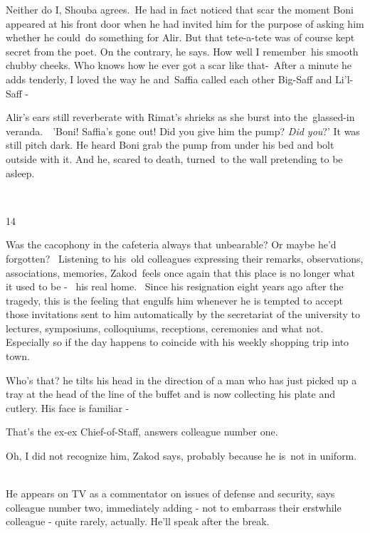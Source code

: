 \documentclass[twoside,11pt]{book}
\begin{document}
{\textquotedbl}Neither do I,{\textquotedbl} Shouba agrees.\  He had in fact noticed that scar the moment Boni appeared
at his front door when he had invited him for the purpose of asking him whether he could\ do something for Alir. But
that tete-a-tete was of course kept secret from the poet. {\textquotedbl}On the contrary,{\textquotedbl} he says.
{\textquotedbl}How well I remember~his smooth chubby cheeks. Who knows how he ever got a scar like
that{}-{\textquotedbl}\ After a minute he adds tenderly, {\textquotedbl}I loved the way he and~Saffia called each other
Big-Saff and Li'l-Saff -{\textquotedbl}

Alir's ears still reverberate with Rimat's shrieks as she burst into the\ glassed-in veranda.\ \ {}'Boni! Saffia's gone
out! Did you give him the pump? \textit{Did you}?' It was still pitch dark. He heard Boni grab the pump from under his
bed and bolt outside with it. And he, scared to death, turned~to the wall pretending to be asleep.

~

14 

Was the cacophony in the cafeteria always that unbearable? Or maybe he'd forgotten? ~Listening to his~old colleagues
expressing their remarks, observations, associations, memories, Zakod~feels once again that this place is no longer
what it used to be -~ his real home. ~Since his resignation eight years ago after the tragedy, this is the feeling that
engulfs him whenever he is tempted to accept those invitations sent to him automatically by the secretariat of the
university to lectures, symposiums, colloquiums, receptions, ceremonies and what not. Especially so if the day happens
to coincide with his weekly shopping trip into town. 

{\textquotedbl}Who's that?{\textquotedbl} he tilts his head in the direction of a man who has just picked up a tray at
the head of the line of the buffet and is now collecting his plate and cutlery. {\textquotedbl}His face is familiar
-{\textquotedbl} 

{\textquotedbl}That's the ex-ex Chief-of-Staff,{\textquotedbl} answers colleague number one. 

{\textquotedbl}Oh, I did not recognize him,{\textquotedbl} Zakod says, {\textquotedbl}probably because he is~not in
uniform.{\textquotedbl} ~

{\textquotedbl}He appears on TV as a commentator on issues of defense and security,{\textquotedbl} says colleague number
two, immediately adding - not to embarrass their erstwhile colleague - {\textquotedbl}quite rarely, actually. He'll
speak after the break.{\textquotedbl} 
\end{document}
